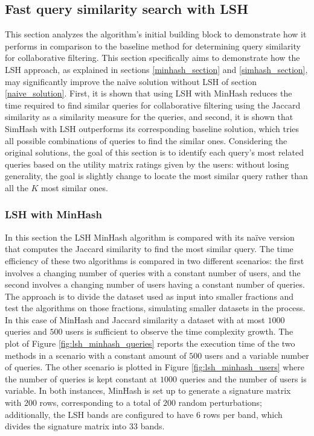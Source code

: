 \subsection{Fast query similarity search with LSH}
\label{fast_sim_search}
This section analyzes the algorithm's initial building block to demonstrate how it performs in comparison to the baseline method for determining query similarity for collaborative filtering. This section specifically aims to demonstrate how the LSH approach, as explained in sections \ref{minhash_section} and \ref{simhash_section}, may significantly improve the naïve solution without LSH of section  \ref{naive_solution}. First, it is shown that using LSH with MinHash reduces the time required to find similar queries for collaborative filtering using the Jaccard similarity as a similarity measure for the queries, and second, it is shown that SimHash with LSH outperforms its corresponding baseline solution, which tries all possible combinations of queries to find the similar ones. Considering the original solutions, the goal of this section is to identify each query's most related queries based on the utility matrix ratings given by the users: without losing generality, the goal is slightly change to locate the most similar query rather than all the $K$ most similar ones. 

\subsubsection{LSH with MinHash}
In this section the LSH MinHash algorithm is compared with its naïve version that computes the Jaccard similarity to find the most similar query. The time efficiency of these two algorithms is compared in two different scenarios: the first involves a changing number of queries with a constant number of users, and the second involves a changing number of users having a constant number of queries. The approach is to divide the dataset used as input into smaller fractions and test the algorithms on those fractions, simulating smaller datasets in the process. In this case of MinHash and Jaccard similarity a dataset with at most $1000$ queries and $500$ users is sufficient to observe the time complexity growth. The plot of Figure \ref{fig:lsh_minhash_queries} reports the execution time of the two methods in a scenario with a constant amount of $500$ users and a variable number of queries. The other scenario is plotted in Figure \ref{fig:lsh_minhash_users} where the number of queries is kept constant at $1000$ queries and the number of users is variable. In both instances, MinHash is set up to generate a signature matrix with $200$ rows, corresponding to a total of $200$ random perturbations; additionally, the LSH bands are configured to have $6$ rows per band, which divides the signature matrix into $33$ bands. 

